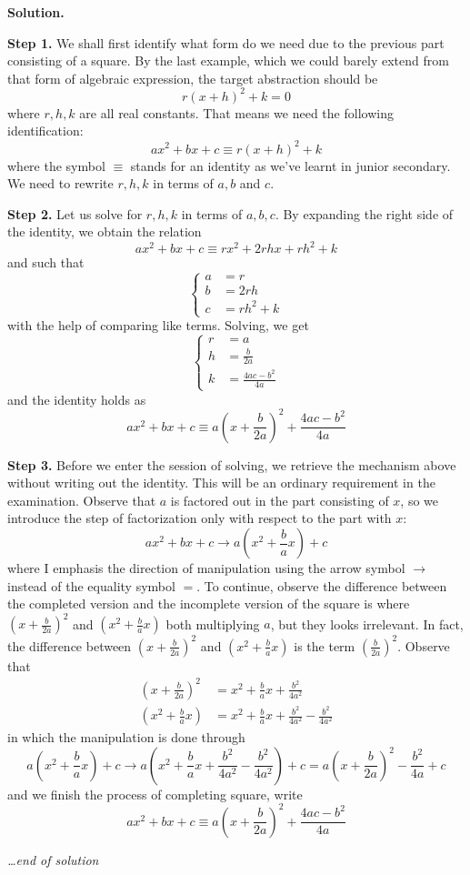 \documentclass[12pt]{article}
\newenvironment{solution}{\begin{snugshade*} \textbf{Solution.} \par}{\hfill \textit{\dots end of solution} \end{snugshade*}}
\begin{document}
    \begin{solution}
        \textbf{Step 1.} We shall first identify what form do we need due to the previous part consisting of a square. By the last example, which we could barely extend from that form of algebraic expression, the target abstraction should be $$r(x+h)^2+k=0$$ where $r,h,k$ are all real constants. That means we need the following identification: $$ax^2+bx+c\equiv r(x+h)^2+k$$ where the symbol $\equiv$ stands for an identity as we've learnt in junior secondary. We need to rewrite $r,h,k$ in terms of $a,b$ and $c$.

        \textbf{Step 2.} Let us solve for $r,h,k$ in terms of $a,b,c$. By expanding the right side of the identity, we obtain the relation $$ax^2+bx+c\equiv rx^2+2rhx+rh^2+k$$ and such that $$\begin{cases}
            a&=r\\
            b&=2rh\\
            c&=rh^2+k
        \end{cases}$$ with the help of comparing like terms. Solving, we get $$\begin{cases}
            r&=a\\
            h&=\displaystyle \frac{b}{2a}\\
            k&=\displaystyle \frac{4ac-b^2}{4a}
        \end{cases}$$ and the identity holds as $$ax^2+bx+c\equiv a(x+\frac{b}{2a})^2+\frac{4ac-b^2}{4a}$$

        \textbf{Step 3.} Before we enter the session of solving, we retrieve the mechanism above without writing out the identity. This will be an ordinary requirement in the examination. Observe that $a$ is factored out in the part consisting of $x$, so we introduce the step of factorization only with respect to the part with $x$: $$ax^2+bx+c \to a(x^2+\frac{b}{a}x)+c$$ where I emphasis the direction of manipulation using the arrow symbol $\to$ instead of the equality symbol $=$. To continue, observe the difference between the completed version and the incomplete version of the square is where $(x+\frac{b}{2a})^2$ and $(x^2+\frac{b}{a}x)$ both multiplying $a$, but they looks irrelevant. In fact, the difference between $(x+\frac{b}{2a})^2$ and $(x^2+\frac{b}{a}x)$ is the term $(\frac{b}{2a})^2$. Observe that \begin{align*}
            (x+\frac{b}{2a})^2&=x^2+\frac{b}{a}x+\frac{b^2}{4a^2}\\
            (x^2+\frac{b}{a}x)&=x^2+\frac{b}{a}x+\frac{b^2}{4a^2}-\frac{b^2}{4a^2}
        \end{align*}
        in which the manipulation is done through $$a(x^2+\frac{b}{a}x)+c \to a(x^2+\frac{b}{a}x+\frac{b^2}{4a^2}-\frac{b^2}{4a^2})+c=a(x+\frac{b}{2a})^2-\frac{b^2}{4a}+c$$ and we finish the process of completing square, write $$ax^2+bx+c\equiv a(x+\frac{b}{2a})^2+\frac{4ac-b^2}{4a}$$


\end{solution}
\end{document}
